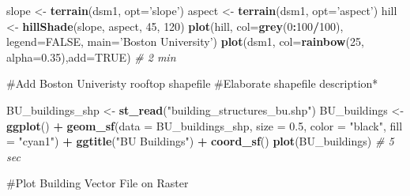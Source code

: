 \documentclass[]{article}
\newenvironment{Shaded}{\begin{snugshade}}{\end{snugshade}}
\newcommand{\CommentTok}[1]{\textcolor[rgb]{0.56,0.35,0.01}{\textit{#1}}}
\newcommand{\DataTypeTok}[1]{\textcolor[rgb]{0.13,0.29,0.53}{#1}}
\newcommand{\DecValTok}[1]{\textcolor[rgb]{0.00,0.00,0.81}{#1}}
\newcommand{\FloatTok}[1]{\textcolor[rgb]{0.00,0.00,0.81}{#1}}
\newcommand{\KeywordTok}[1]{\textcolor[rgb]{0.13,0.29,0.53}{\textbf{#1}}}
\newcommand{\NormalTok}[1]{#1}
\newcommand{\OperatorTok}[1]{\textcolor[rgb]{0.81,0.36,0.00}{\textbf{#1}}}
\newcommand{\OtherTok}[1]{\textcolor[rgb]{0.56,0.35,0.01}{#1}}
\newcommand{\StringTok}[1]{\textcolor[rgb]{0.31,0.60,0.02}{#1}}
\begin{document}
\begin{Shaded}
\begin{Highlighting}[]
\NormalTok{slope  <-}\StringTok{ }\KeywordTok{terrain}\NormalTok{(dsm1, }\DataTypeTok{opt=}\StringTok{'slope'}\NormalTok{)}
\NormalTok{aspect <-}\StringTok{ }\KeywordTok{terrain}\NormalTok{(dsm1, }\DataTypeTok{opt=}\StringTok{'aspect'}\NormalTok{)}
\NormalTok{hill <-}\StringTok{ }\KeywordTok{hillShade}\NormalTok{(slope, aspect, }\DecValTok{45}\NormalTok{, }\DecValTok{120}\NormalTok{)}
\KeywordTok{plot}\NormalTok{(hill, }\DataTypeTok{col=}\KeywordTok{grey}\NormalTok{(}\DecValTok{0}\OperatorTok{:}\DecValTok{100}\OperatorTok{/}\DecValTok{100}\NormalTok{), }\DataTypeTok{legend=}\OtherTok{FALSE}\NormalTok{, }\DataTypeTok{main=}\StringTok{'Boston University'}\NormalTok{)}
\KeywordTok{plot}\NormalTok{(dsm1, }\DataTypeTok{col=}\KeywordTok{rainbow}\NormalTok{(}\DecValTok{25}\NormalTok{, }\DataTypeTok{alpha=}\FloatTok{0.35}\NormalTok{),}\DataTypeTok{add=}\OtherTok{TRUE}\NormalTok{) }\CommentTok{# 2 min}
\end{Highlighting}
\end{Shaded}

\#Add Boston Univeristy rooftop shapefile \#Elaborate shapefile
description*

\begin{Shaded}
\begin{Highlighting}[]
\NormalTok{BU_buildings_shp <-}\StringTok{ }\KeywordTok{st_read}\NormalTok{(}\StringTok{"building_structures_bu.shp"}\NormalTok{)}
\NormalTok{BU_buildings <-}\StringTok{ }\KeywordTok{ggplot}\NormalTok{() }\OperatorTok{+}\StringTok{ }
\StringTok{  }\KeywordTok{geom_sf}\NormalTok{(}\DataTypeTok{data =}\NormalTok{ BU_buildings_shp, }\DataTypeTok{size =} \FloatTok{0.5}\NormalTok{, }\DataTypeTok{color =} \StringTok{"black"}\NormalTok{, }\DataTypeTok{fill =} \StringTok{"cyan1"}\NormalTok{) }\OperatorTok{+}\StringTok{ }
\StringTok{  }\KeywordTok{ggtitle}\NormalTok{(}\StringTok{"BU Buildings"}\NormalTok{) }\OperatorTok{+}\StringTok{ }
\StringTok{  }\KeywordTok{coord_sf}\NormalTok{()}
\KeywordTok{plot}\NormalTok{(BU_buildings) }\CommentTok{# 5 sec}
\end{Highlighting}
\end{Shaded}

\#Plot Building Vector File on Raster
\end{document}
